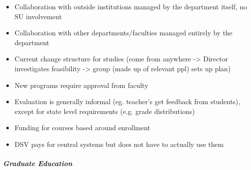 \begin{itemize}

\item Collaboration with outside institutions managed by the department  itself, no SU involvement %

\item Collaboration with other departments/faculties managed entirely by the department %

\item Current change structure for studies (come from anywhere -> Director investigates feasibility -> group (made up of relevant ppl) sets up plan)

\item New programs require approval from faculty

\item Evaluation is generally informal (eg. teacher's get feedback from students), except for state level requirements (e.g. grade distributions)

\item Funding for courses based around enrollment 

\item DSV pays for central systems but does not have to actually use them

\end{itemize}
\subparagraph*{Graduate Education}
